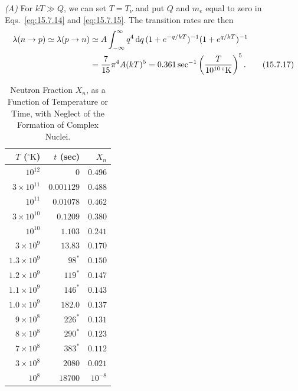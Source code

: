 \emph{(A)} For \(kT\gg Q\), we can set \(T=T_\nu\) and put \(Q\) and \(m_e\)
equal to zero in Eqs.~\eqref{eq:15.7.14} and \eqref{eq:15.7.15}. The
transition rates are then
\begin{align}
  \lambda(n\to p)
  \simeq
  \lambda(p\to n)
  &\simeq
  A\int_{-\infty}^{\infty}
  q^4\mathop{}\!\mathrm{d} q\,
  (1+e^{-q/kT})^{-1}
  (1+e^{q/kT})^{-1}
  \notag\\
  &=
  \frac{7}{15}\pi^4A(kT)^5
  =
  0.361\,\mathrm{sec}^{-1}
  \left(
    \frac{T}{10^{10\,\circ}\mathrm K}
  \right)^5.
  \tag{15.7.17}\label{eq:15.7.17}
\end{align}

\begingroup
\renewcommand{\thetable}{15.5}
\begin{table}[htbp]
  \centering
  \caption{Neutron Fraction \(X_n\), as a Function of Temperature or Time,
  with Neglect of the Formation of Complex Nuclei.}
  \label{tab:15.5}
  \small
  \begin{tabular}{@{}rrr@{}}
    \toprule
    \(T\) (\(^{\circ}\mathrm K\)) & \(t\) (sec) & \(X_n\) \\
    \midrule
    \(10^{12}\)        & \(0\)        & \(0.496\) \\
    \(3\times10^{11}\) & \(0.001129\) & \(0.488\) \\
    \(10^{11}\)        & \(0.01078\)  & \(0.462\) \\
    \(3\times10^{10}\) & \(0.1209\)   & \(0.380\) \\
    \(10^{10}\)        & \(1.103\)    & \(0.241\) \\
    \(3\times10^9\)    & \(13.83\)    & \(0.170\) \\
    \(1.3\times10^9\)  & \(98^*\)     & \(0.150\) \\
    \(1.2\times10^9\)  & \(119^*\)    & \(0.147\) \\
    \(1.1\times10^9\)  & \(146^*\)    & \(0.143\) \\
    \(1.0\times10^9\)  & \(182.0\)    & \(0.137\) \\
    \(9\times10^8\)    & \(226^*\)    & \(0.131\) \\
    \(8\times10^8\)    & \(290^*\)    & \(0.123\) \\
    \(7\times10^8\)    & \(383^*\)    & \(0.112\) \\
    \(3\times10^8\)    & \(2080\)     & \(0.021\) \\
    \(10^8\)           & \(18700\)    & \(10^{-8}\) \\
    \bottomrule
  \end{tabular}


\end{table}
